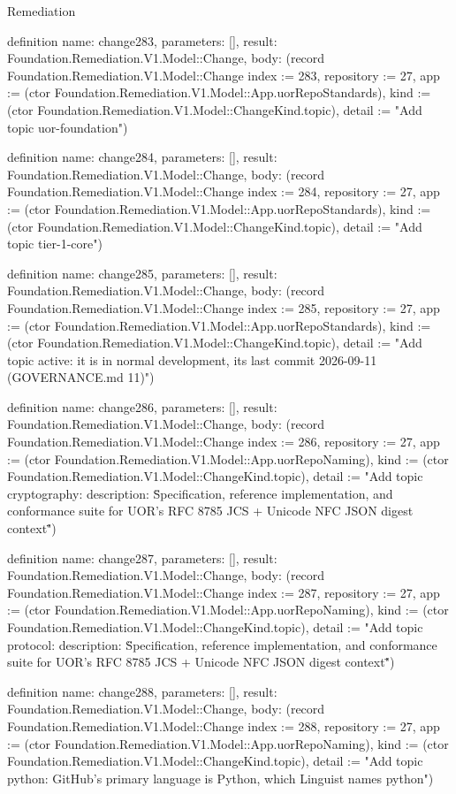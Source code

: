 \begin{lexlean}{Remediation}
\begin{semanticmodule}
definition{
  name: change283,
  parameters: [],
  result: Foundation.Remediation.V1.Model::Change,
  body: (record Foundation.Remediation.V1.Model::Change {index := 283, repository := 27, app := (ctor Foundation.Remediation.V1.Model::App.uorRepoStandards), kind := (ctor Foundation.Remediation.V1.Model::ChangeKind.topic), detail := "Add topic uor-foundation"})
}

definition{
  name: change284,
  parameters: [],
  result: Foundation.Remediation.V1.Model::Change,
  body: (record Foundation.Remediation.V1.Model::Change {index := 284, repository := 27, app := (ctor Foundation.Remediation.V1.Model::App.uorRepoStandards), kind := (ctor Foundation.Remediation.V1.Model::ChangeKind.topic), detail := "Add topic tier-1-core"})
}

definition{
  name: change285,
  parameters: [],
  result: Foundation.Remediation.V1.Model::Change,
  body: (record Foundation.Remediation.V1.Model::Change {index := 285, repository := 27, app := (ctor Foundation.Remediation.V1.Model::App.uorRepoStandards), kind := (ctor Foundation.Remediation.V1.Model::ChangeKind.topic), detail := "Add topic active: it is in normal development, its last commit 2026-09-11 (GOVERNANCE.md 11)"})
}

definition{
  name: change286,
  parameters: [],
  result: Foundation.Remediation.V1.Model::Change,
  body: (record Foundation.Remediation.V1.Model::Change {index := 286, repository := 27, app := (ctor Foundation.Remediation.V1.Model::App.uorRepoNaming), kind := (ctor Foundation.Remediation.V1.Model::ChangeKind.topic), detail := "Add topic cryptography: description: \"Specification, reference implementation, and conformance suite for UOR's RFC 8785 JCS + Unicode NFC JSON digest context\""})
}

definition{
  name: change287,
  parameters: [],
  result: Foundation.Remediation.V1.Model::Change,
  body: (record Foundation.Remediation.V1.Model::Change {index := 287, repository := 27, app := (ctor Foundation.Remediation.V1.Model::App.uorRepoNaming), kind := (ctor Foundation.Remediation.V1.Model::ChangeKind.topic), detail := "Add topic protocol: description: \"Specification, reference implementation, and conformance suite for UOR's RFC 8785 JCS + Unicode NFC JSON digest context\""})
}

definition{
  name: change288,
  parameters: [],
  result: Foundation.Remediation.V1.Model::Change,
  body: (record Foundation.Remediation.V1.Model::Change {index := 288, repository := 27, app := (ctor Foundation.Remediation.V1.Model::App.uorRepoNaming), kind := (ctor Foundation.Remediation.V1.Model::ChangeKind.topic), detail := "Add topic python: GitHub's primary language is Python, which Linguist names python"})
}


\end{semanticmodule}
\end{lexlean}
